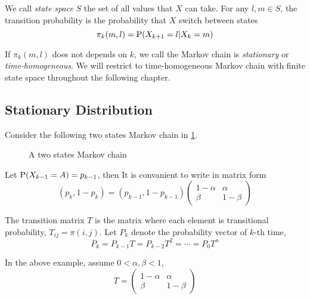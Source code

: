 We call \textit{state space} $S$ the set of all values that $X$ can take. For any $l,m\in S$, the transition probability is the probability that $X$ switch between states
$$\pi_k(m,l) = \P(X_{k+1} = l |X_{k} = m)$$

If $\pi_k(m,l)$ does not depends on $k$, we call the Markov chain is \textit{stationary} or \textit{time-homogeneous}. We will restrict to time-homogeneous Markov chain with finite state space throughout the following chapter.

\subsection{Stationary Distribution}
Consider the following two states Markov chain in \ref{fig:markov}.
\begin{figure}[h]
	\centering
	\caption{A two states Markov chain}
	\label{fig:markov}
\end{figure} 

Let $\P(X_{k-1} = A) = p_{k-1}$, then
It is convanient to write in matrix form
$$\left(p_k, 1-p_k \right) = \left(p_{k-1},1-p_{k-1}\right) \left( \begin{matrix}
	1-\alpha & \alpha\\
	\beta    & 1-\beta
\end{matrix}\right) $$

The transition matrix $T$ is the matrix where each element is transitional probability, $T_{ij} = \pi(i,j)$. Let $P_k$ denote the probability vector of $k$-th time,
$$P_k = P_{k-1}T=P_{k-2}T^2 = \cdots = P_0 T^n$$

In the above example, assume $0<\alpha,\beta<1$,
$$T = \left( \begin{matrix}
	1-\alpha & \alpha\\
	\beta    & 1-\beta
\end{matrix}\right) $$

